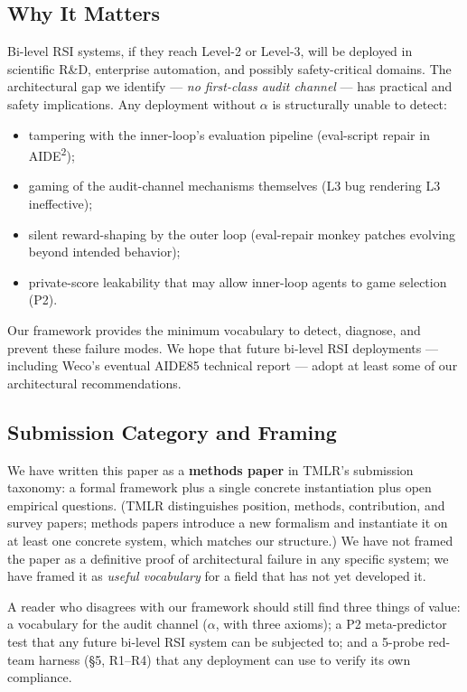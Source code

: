 \documentclass{article}
\theoremstyle{definition}
\begin{document}
\subsection{Why It Matters}

Bi-level RSI systems, if they reach Level-2 or Level-3, will be deployed in scientific R\&D, enterprise automation, and possibly safety-critical domains. The architectural gap we identify --- \emph{no first-class audit channel} --- has practical and safety implications. Any deployment without $\alpha$ is structurally unable to detect:
\begin{itemize}
    \item tampering with the inner-loop's evaluation pipeline (eval-script repair in AIDE\textsuperscript{2});
    \item gaming of the audit-channel mechanisms themselves (L3 bug rendering L3 ineffective);
    \item silent reward-shaping by the outer loop (eval-repair monkey patches evolving beyond intended behavior);
    \item private-score leakability that may allow inner-loop agents to game selection (P2).
\end{itemize}

Our framework provides the minimum vocabulary to detect, diagnose, and prevent these failure modes. We hope that future bi-level RSI deployments --- including Weco's eventual AIDE85 technical report --- adopt at least some of our architectural recommendations.

\subsection{Submission Category and Framing}

We have written this paper as a \textbf{methods paper} in TMLR's submission taxonomy: a formal framework plus a single concrete instantiation plus open empirical questions. (TMLR distinguishes position, methods, contribution, and survey papers; methods papers introduce a new formalism and instantiate it on at least one concrete system, which matches our structure.) We have not framed the paper as a definitive proof of architectural failure in any specific system; we have framed it as \emph{useful vocabulary} for a field that has not yet developed it.

A reader who disagrees with our framework should still find three things of value: a vocabulary for the audit channel ($\alpha$, with three axioms); a P2 meta-predictor test that any future bi-level RSI system can be subjected to; and a 5-probe red-team harness (\S5, R1--R4) that any deployment can use to verify its own compliance.
\end{document}
